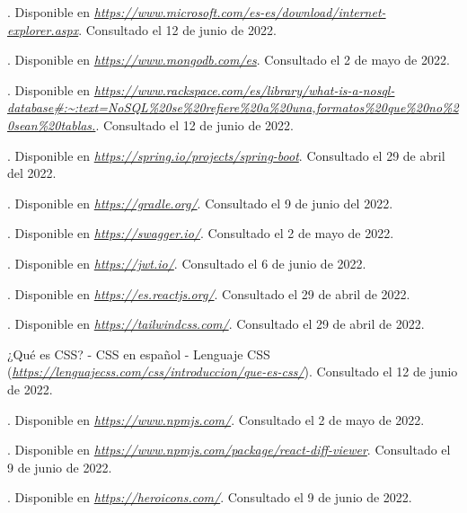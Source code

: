 \begin{thebibliography}{99}
. Disponible en {\it \url{https://www.microsoft.com/es-es/download/internet-explorer.aspx}}. Consultado el 12 de junio de 2022.

. Disponible en {\it \url{https://www.mongodb.com/es}}. Consultado el 2 de mayo de 2022.

. Disponible en {\it \url{https://www.rackspace.com/es/library/what-is-a-nosql-database#:~:text=NoSQL%20se%20refiere%20a%20una,formatos%20que%20no%20sean%20tablas.}}. Consultado el 12 de junio de 2022.

. Disponible en {\it \url{https://spring.io/projects/spring-boot}}. Consultado el 29 de abril del 2022.

. Disponible en {\it \url{https://gradle.org/}}. Consultado el 9 de junio del 2022.

. Disponible en {\it \url{https://swagger.io/}}. Consultado el 2 de mayo de 2022.

. Disponible en {\it \url{https://jwt.io/}}. Consultado el 6 de junio de 2022.

. Disponible en {\it \url{https://es.reactjs.org/}}. Consultado el 29 de abril de 2022.

. Disponible en {\it \url{https://tailwindcss.com/}}. Consultado el 29 de abril de 2022.

 ¿Qué es CSS? - CSS en español - Lenguaje CSS ({\it \url{https://lenguajecss.com/css/introduccion/que-es-css/}}). Consultado el 12 de junio de 2022.

. Disponible en {\it \url{https://www.npmjs.com/}}. Consultado el 2 de mayo de 2022.

. Disponible en {\it \url{https://www.npmjs.com/package/react-diff-viewer}}. Consultado el 9 de junio de 2022.

. Disponible en {\it \url{https://heroicons.com/}}. Consultado el 9 de junio de 2022.


\end{thebibliography}
